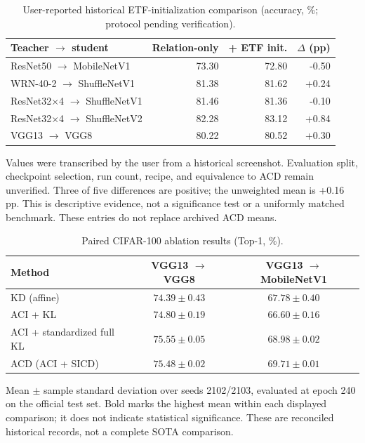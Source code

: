 \begin{table}[t]
\centering
\small
\setlength{\tabcolsep}{5pt}
\caption{User-reported historical ETF-initialization comparison (accuracy, \%; protocol pending verification).}
\label{tab:etf_user_reported}
\begin{tabular}{lrrr}
\toprule
Teacher $\to$ student & Relation-only & + ETF init. & $\Delta$ (pp) \\
\midrule
ResNet50 $\to$ MobileNetV1 & 73.30 & 72.80 & -0.50 \\
WRN-40-2 $\to$ ShuffleNetV1 & 81.38 & 81.62 & +0.24 \\
ResNet32$\times$4 $\to$ ShuffleNetV1 & 81.46 & 81.36 & -0.10 \\
ResNet32$\times$4 $\to$ ShuffleNetV2 & 82.28 & 83.12 & +0.84 \\
VGG13 $\to$ VGG8 & 80.22 & 80.52 & +0.30 \\
\bottomrule
\end{tabular}
\par\smallskip
\begin{minipage}{0.96\textwidth}\footnotesize
Values were transcribed by the user from a historical screenshot. Evaluation split, checkpoint selection, run count, recipe, and equivalence to ACD remain unverified. Three of five differences are positive; the unweighted mean is +0.16 pp. This is descriptive evidence, not a significance test or a uniformly matched benchmark. These entries do not replace archived ACD means.
\end{minipage}
\end{table}

\begin{table}[t]
\centering
\small
\setlength{\tabcolsep}{5pt}
\caption{Paired CIFAR-100 ablation results (Top-1, \%).}
\label{tab:cifar_paired}
\begin{tabular}{lcc}
\toprule
Method & VGG13 $\to$ VGG8 & VGG13 $\to$ MobileNetV1 \\
\midrule
KD (affine) & $74.39\pm0.43$ & $67.78\pm0.40$ \\
ACI + KL & $74.80\pm0.19$ & $66.60\pm0.16$ \\
ACI + standardized full KL & $\mathbf{75.55\pm0.05}$ & $68.98\pm0.02$ \\
ACD (ACI + SICD) & $75.48\pm0.02$ & $\mathbf{69.71\pm0.01}$ \\
\bottomrule
\end{tabular}
\par\smallskip
\begin{minipage}{0.96\textwidth}\footnotesize
Mean $\pm$ sample standard deviation over seeds 2102/2103, evaluated at epoch 240 on the official test set. Bold marks the highest mean within each displayed comparison; it does not indicate statistical significance. These are reconciled historical records, not a complete SOTA comparison.
\end{minipage}
\end{table}

